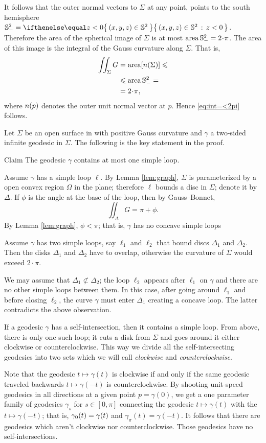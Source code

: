 It follows that the outer normal vectors to $\Sigma$ at any point, points to the south hemisphere $\SS^2_-=\set{(x,y,z)\in\SS^2}{z< 0}$.
Therefore the area of the spherical image of $\Sigma$ is at most $\area\SS^2_-= 2\cdot\pi$.
The area of this image is the integral of the Gauss curvature along $\Sigma$.
That is,
\begin{align*}
\iint_{\Sigma}G&=\area[\Norm(\Sigma)]\le 
\\
&\le \area\SS^2_-=
\\
&=2\cdot\pi,
\end{align*}
where $n(p)$ denotes the outer unit normal vector at $p$.
Hence \ref{eq:int=<2pi} follows.
\qeds

Let $\Sigma$ be an open surface in with positive Gauss curvature and $\gamma$ a two-sided infinite geodesic in $\Sigma$.
The following is the key statement in the proof.

\begin{thm}{Claim}
The geodesic $\gamma$ contains at most one simple loop.
\end{thm}

Assume $\gamma$ has a simple loop $\ell$.
By Lemma \ref{lem:graph}, $\Sigma$ is parameterized by a open convex region $\Omega$ in the plane;
therefore $\ell$ bounds a disc in $\Sigma$; denote it by $\Delta$.
If $\phi$ is the angle at the base of the loop, then by Gauss--Bonnet,
\[\iint_\Delta G=\pi+\phi.\] 
By Lemma \ref{lem:graph}, $\phi<\pi$; that is, $\gamma$ has no concave simple loops 

Assume $\gamma$ has two simple loops, say $\ell_1$ and $\ell_2$ that bound discs $\Delta_1$ and $\Delta_2$.
Then the disks $\Delta_1$ and $\Delta_2$ have to overlap,
otherwise the curvature of $\Sigma$ would exceed $2\cdot\pi$.

We may assume that $\Delta_1\not\subset \Delta_2$; the loop $\ell_2$ appears after $\ell_1$ on $\gamma$ and there are no other simple loops between them.
In this case, after going around $\ell_1$ and before closing $\ell_2$, the curve $\gamma$ must enter $\Delta_1$ creating a concave loop.
The latter contradicts the above observation.

If a geodesic $\gamma$ has a self-intersection,
then it contains a simple loop.
From above, there is only one such loop;
it cuts a disk from $\Sigma$ 
and goes around it either clockwise or counterclockwise.
This way we divide all the self-intersecting geodesics 
into two sets which we will call {}\emph{clockwise} and {}\emph{counterclockwise}.

Note that the geodesic $t\mapsto \gamma(t)$ is clockwise 
if and only if the same geodesic traveled backwards
$t\mapsto \gamma(-t)$
is counterclockwise.
By shooting unit-speed geodesics in all directions at a given point $p=\gamma(0)$,
we get a one parameter family of geodesics $\gamma_s$ for $s\in[0,\pi]$ connecting the geodesic $t\mapsto \gamma(t)$ with
the $t\mapsto \gamma(-t)$; that is, $\gamma_0(t)\z=\gamma(t)$ and $\gamma_\pi(t)=\gamma(-t)$. 
It follows that there are geodesics 
which aren't clockwise nor counterclockwise.
Those geodesics have no self-intersections.\qeds



